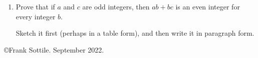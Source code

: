 \documentclass[12pt]{article}
\begin{document}
\begin{enumerate}
\item  Prove that if $a$ and $c$ are odd integers, then $ab+bc$ is an even integer for every integer $b$.\bigskip\newline 
  
   Sketch it first (perhaps in a table form), and then write it in paragraph form.


\end{enumerate}\vfill 

\noindent\copyright Frank Sottile.  September 2022.
\end{document}
